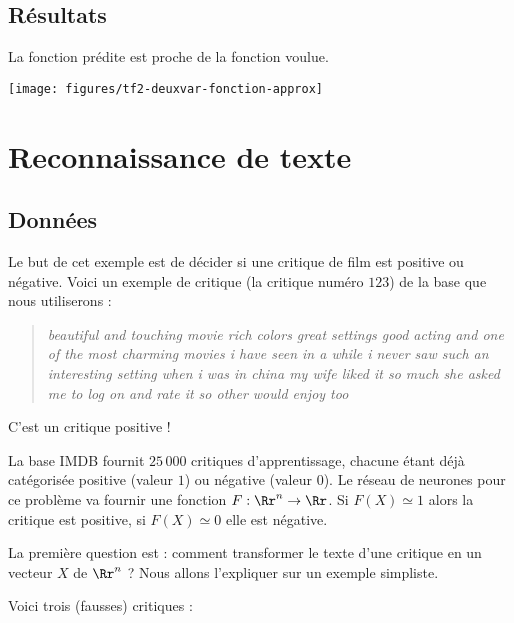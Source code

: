 \documentclass[11pt,class=report,crop=false]{standalone}
\begin{document}
\subsection{Résultats}


La fonction prédite est proche de la fonction voulue.

\begin{center}
\texttt{[image: figures/tf2-deuxvar-fonction-approx]}
\end{center}


\section{Reconnaissance de texte}

\subsection{Données}

Le but de cet exemple est de décider si une critique de film est positive ou négative.
Voici un exemple de critique (la critique numéro $123$) de la base que nous utiliserons :
\begin{quote} 
\emph{beautiful and touching movie rich colors great settings good acting and one of the most charming movies i have seen in a while i never saw such an interesting setting when i was in china my wife liked it so much she asked me to log on and rate it so other would enjoy too}
\end{quote}
C'est un critique positive !


La base IMDB fournit $25\,000$ critiques d'apprentissage, chacune étant déjà catégorisée positive (valeur $1$) ou négative (valeur $0$).
Le réseau de neurones pour ce problème va fournir une fonction $F : \Rr^n \to \Rr$.
Si $F(X) \simeq 1$ alors la critique est positive, si $F(X) \simeq 0$ elle est négative.

La première question est : comment transformer le texte d'une critique en un vecteur $X$ de $\Rr^n$ ?
Nous allons l'expliquer sur un exemple simpliste.

Voici trois (fausses) critiques :
\end{document}
